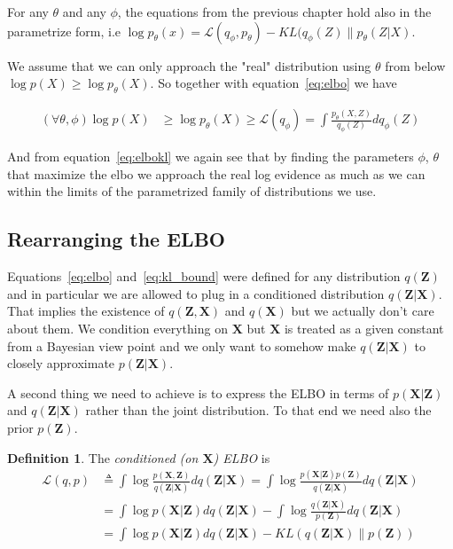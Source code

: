 \documentclass[11pt, a4paper]{report}
\theoremstyle{plain}
\theoremstyle{definition}
\newtheorem{mydef}{Definition}[chapter]
\theoremstyle{remark}
\newcommand{\X}{\mathbf{X}}
\newcommand{\Z}{\mathbf{Z}}
\begin{document}
For any $\theta$ and any $\phi$, the equations from the previous chapter hold
also in the parametrize form, i.e $\log p_{\theta}(x) = \mathcal{L}(q_{\phi},
p_{\theta}) -
KL(q_{\phi}(Z) \| p_{\theta}(Z|X)$.

We assume that we can only approach the "real" distribution using
$\theta$ from below $\log p(X) \geq \log p_{\theta}(X)$.
So together with equation~\ref{eq:elbo} we have

\begin{equation}\label{eq:parelbo}
\begin{aligned}
(\forall \theta, \phi)\log p(X) & \geq \log p_{\theta}(X) \geq \mathcal{L}(q_{\phi})
= \int \frac{p_{\theta}(X,Z)}{q_{\phi}(Z)} dq_{\phi}(Z)
\end{aligned}
\end{equation}

And from equation~\ref{eq:elbokl} we again see that by finding the parameters
$\phi$, $\theta$ that maximize the elbo we approach the real log evidence as much
as we can within the limits of the parametrized family of distributions we use.

\subsection{Rearranging the ELBO}
Equations~\ref{eq:elbo} and~\ref{eq:kl_bound} were defined for any distribution
$q(\Z)$ and in particular we are allowed to plug in a conditioned
distribution $q(\Z|\X)$. That implies the existence of $q(\Z,\X)$ and $q(\X)$
but we actually don't care about them. We condition everything on $\X$ but $\X$
is treated as a given constant from a Bayesian view point and we only want to
somehow make $q(\Z|\X)$ to closely approximate $p(\Z | \X)$.

A second thing we need to achieve is to express the ELBO in terms of $p(\X|\Z)$
and $q(\Z|\X)$ rather than the joint distribution. To that end we need also the
prior $p(\Z)$.

\begin{mydef}
The \emph{conditioned (on $\X$) ELBO} is
\begin{equation}
\begin{aligned}
\mathcal{L}(q,p) &\triangleq \int \log \frac{p(\X,\Z)}{q(\Z|\X)}dq(\Z|\X) 
= \int \log \frac{p(\X |\Z) p(\Z)}{q(\Z|\X)}dq(\Z|\X) \\
&= \int \log p(\X | \Z)dq(\Z|\X) - \int \log \frac{q(\Z|\X)}{p(\Z)}dq(\Z|\X) \\
&= \int \log p(\X | \Z)dq(\Z|\X) - KL(q(\Z|\X) \| p(\Z))
\label{eq:elbo_conditioned}
\end{aligned}
\end{equation}
\end{mydef}
\end{document}
